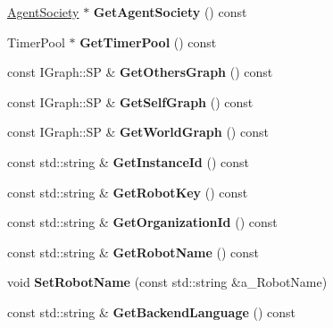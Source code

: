 \begin{DoxyCompactItemize}
\hyperlink{class_agent_society}{Agent\+Society} $\ast$ {\bfseries Get\+Agent\+Society} () const
\item 
\mbox{\label{class_self_instance_ae651b5e653e0885b134efa0f00bbf396}} 
Timer\+Pool $\ast$ {\bfseries Get\+Timer\+Pool} () const
\item 
\mbox{\label{class_self_instance_a1d1f5b125c9f1517120a21415736c5cd}} 
const I\+Graph\+::\+SP \& {\bfseries Get\+Others\+Graph} () const
\item 
\mbox{\label{class_self_instance_aa62758efd3f14a06762529008d6ea503}} 
const I\+Graph\+::\+SP \& {\bfseries Get\+Self\+Graph} () const
\item 
\mbox{\label{class_self_instance_a0c6ea90f52ba3db61a326550ccc29d88}} 
const I\+Graph\+::\+SP \& {\bfseries Get\+World\+Graph} () const
\item 
\mbox{\label{class_self_instance_a5ff5c2fbb51ada97c503fea416fee56c}} 
const std\+::string \& {\bfseries Get\+Instance\+Id} () const
\item 
\mbox{\label{class_self_instance_abc0e07164f89746fca8390e467404e6e}} 
const std\+::string \& {\bfseries Get\+Robot\+Key} () const
\item 
\mbox{\label{class_self_instance_ad30763e328de0e01691cdd8692fb484d}} 
const std\+::string \& {\bfseries Get\+Organization\+Id} () const
\item 
\mbox{\label{class_self_instance_a267458318eb7e37a0ef7f2a6121f54eb}} 
const std\+::string \& {\bfseries Get\+Robot\+Name} () const
\item 
\mbox{\label{class_self_instance_ac08bf09be977e71fcf45b850bdf0d9be}} 
void {\bfseries Set\+Robot\+Name} (const std\+::string \&a\+\_\+\+Robot\+Name)
\item 
\mbox{\label{class_self_instance_ab916555a56d39beb0eb6b52783d821e9}} 
const std\+::string \& {\bfseries Get\+Backend\+Language} () const
\item 

\end{DoxyCompactItemize}
